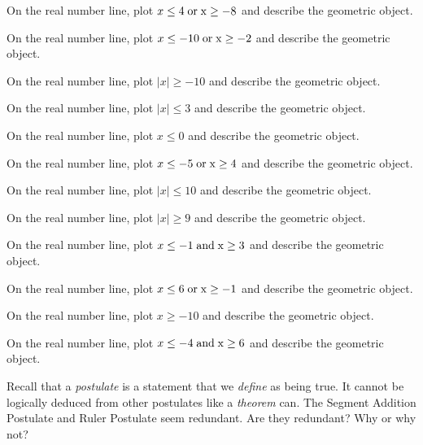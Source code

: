 \documentclass[12pt]{article}
\newenvironment{problem}[2][Problem]{\begin{trivlist}
			\item[\hskip \labelsep {\bfseries #1}\hskip \labelsep {\bfseries #2.}]}{\end{trivlist}}
\begin{document}
			\begin{problem}{0} 
On the real number line, plot $ x \leq 4 \;\rm{ or }\; x \geq -8$ and describe the geometric object.
 \end{problem}\begin{problem}{1} 
On the real number line, plot $ x \leq -10 \;\rm{ or }\; x \geq -2$ and describe the geometric object.
 \end{problem}\begin{problem}{2} 
On the real number line, plot $\mid x\mid \geq -10$ and describe the geometric object.
 \end{problem}\begin{problem}{3} 
On the real number line, plot $\mid x\mid \leq 3$ and describe the geometric object.
 \end{problem}\begin{problem}{4} 
On the real number line, plot $x \leq 0$ and describe the geometric object.
 \end{problem}\begin{problem}{5} 
On the real number line, plot $ x \leq -5 \;\rm{ or }\; x \geq 4$ and describe the geometric object.
 \end{problem}\begin{problem}{6} 
On the real number line, plot $\mid x\mid \leq 10$ and describe the geometric object.
 \end{problem}\begin{problem}{7} 
On the real number line, plot $\mid x\mid \geq 9$ and describe the geometric object.
 \end{problem}\begin{problem}{8} 
On the real number line, plot $ x \leq -1 \;\rm{ and }\; x \geq 3$ and describe the geometric object.
 \end{problem}\begin{problem}{9} 
On the real number line, plot $ x \leq 6 \;\rm{ or }\; x \geq -1$ and describe the geometric object.
 \end{problem}\begin{problem}{10} 
On the real number line, plot $x \geq -10$ and describe the geometric object.
 \end{problem}\begin{problem}{11} 
On the real number line, plot $ x \leq -4 \;\rm{ and }\; x \geq 6$ and describe the geometric object.
 \end{problem}\begin{problem}{Challenge} 

	Recall that a \textit{postulate} is a statement that we \textit{define} as being true. It cannot
	be logically deduced from other postulates like a \textit{theorem} can.
	The Segment Addition Postulate and Ruler Postulate seem redundant. Are they redundant? Why or why not?
	
 \end{problem}
\end{document}
